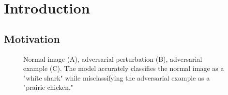 \chapter{Introduction}
\label{Introduction}

\section{Motivation}
\begin{figure}[ht]
    \centering
    \caption{Normal image (A), adversarial perturbation (B), adversarial
        example (C). The model accurately classifies the normal image as a
        "white shark" while misclassifying the adversarial example as a "prairie
        chicken."}
    \label{fig:adversarial_examples}
\end{figure}

